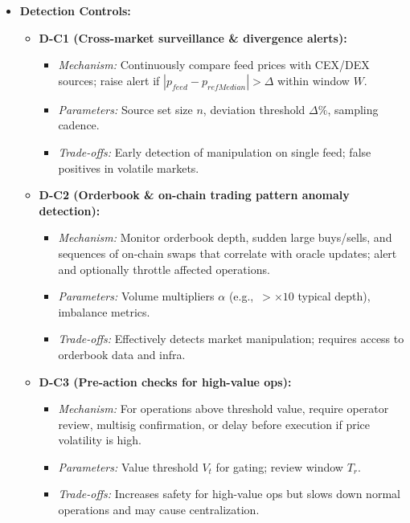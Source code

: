\begin{itemize}
\begin{itemize}
\begin{itemize}
                \end{itemize}
        \end{itemize}
    \item \textbf{Detection Controls:}
        \begin{itemize}
            \item \textbf{D-C1 (Cross-market surveillance \& divergence alerts):}
                \begin{itemize}
                    \item \textit{Mechanism:} Continuously compare feed prices with CEX/DEX sources; raise alert if $|p_{feed} - p_{refMedian}| > \Delta$ within window $W$. \cite{chainalysis2023oracle}
                    \item \textit{Parameters:} Source set size $n$, deviation threshold $\Delta\%$, sampling cadence.
                    \item \textit{Trade-offs:} Early detection of manipulation on single feed; false positives in volatile markets.
                \end{itemize}
            \item \textbf{D-C2 (Orderbook \& on-chain trading pattern anomaly detection):}
                \begin{itemize}
                    \item \textit{Mechanism:} Monitor orderbook depth, sudden large buys/sells, and sequences of on-chain swaps that correlate with oracle updates; alert and optionally throttle affected operations. \cite{solidus2022mango}
                    \item \textit{Parameters:} Volume multipliers $\alpha$ (e.g.,\ $> \times 10$ typical depth), imbalance metrics.
                    \item \textit{Trade-offs:} Effectively detects market manipulation; requires access to orderbook data and infra.
                \end{itemize}
            \item \textbf{D-C3 (Pre-action checks for high-value ops):}
                \begin{itemize}
                    \item \textit{Mechanism:} For operations above threshold value, require operator review, multisig confirmation, or delay before execution if price volatility is high.
                    \item \textit{Parameters:} Value threshold $V_t$ for gating; review window $T_r$.
                    \item \textit{Trade-offs:} Increases safety for high-value ops but slows down normal operations and may cause centralization.
                \end{itemize}
        \end{itemize}
\end{itemize}

